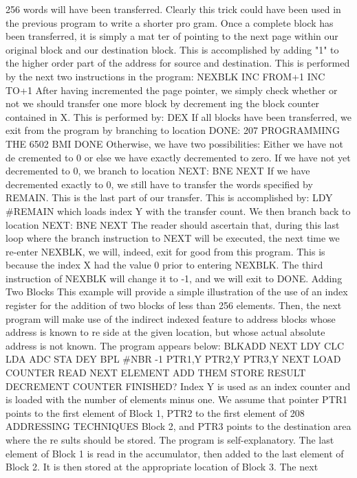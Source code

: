 \documentclass{book}
\begin{document}
256 words will have been transferred. Clearly this trick could
have been used in the previous program to write a shorter pro
gram.
Once a complete block has been transferred, it is simply a mat
ter of pointing to the next page within our original block and our
destination block. This is accomplished by adding "1" to the
higher order part of the address for source and destination. This is
performed by the next two instructions in the program:
NEXBLK INC FROM+1
INC TO+1
After having incremented the page pointer, we simply check
whether or not we should transfer one more block by decrement
ing the block counter contained in X. This is performed by:
DEX
If all blocks have been transferred, we exit from the program by
branching to location DONE:
207
PROGRAMMING THE 6502
BMI DONE
Otherwise, we have two possibilities: Either we have not de
cremented to 0 or else we have exactly decremented to zero. If we
have not yet decremented to 0, we branch to location NEXT:
BNE NEXT
If we have decremented exactly to 0, we still have to transfer
the words specified by REMAIN. This is the last part of our
transfer. This is accomplished by:
LDY #REMAIN
which loads index Y with the transfer count.
We then branch back to location NEXT:
BNE NEXT
The reader should ascertain that, during this last loop where
the branch instruction to NEXT will be executed, the next time
we re-enter NEXBLK, we will, indeed, exit for good from this
program. This is because the index X had the value 0 prior to
entering NEXBLK. The third instruction of NEXBLK will
change it to -1, and we will exit to DONE.
Adding Two Blocks
This example will provide a simple illustration of the use of an
index register for the addition of two blocks of less than 256
elements. Then, the next program will make use of the indirect
indexed feature to address blocks whose address is known to re
side at the given location, but whose actual absolute address is
not known. The program appears below:
BLKADD
NEXT
LDY
CLC
LDA
ADC
STA
DEY
BPL
#NBR -1
PTR1,Y
PTR2,Y
PTR3,Y
NEXT
LOAD COUNTER
READ NEXT ELEMENT
ADD THEM
STORE RESULT
DECREMENT COUNTER
FINISHED?
Index Y is used as an index counter and is loaded with the
number of elements minus one. We assume that pointer PTR1
points to the first element of Block 1, PTR2 to the first element of
208
ADDRESSING TECHNIQUES
Block 2, and PTR3 points to the destination area where the re
sults should be stored.
The program is self-explanatory. The last element of Block 1 is
read in the accumulator, then added to the last element of Block
2. It is then stored at the appropriate location of Block 3. The next
\end{document}
